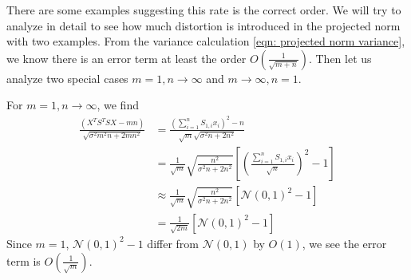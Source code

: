 \documentclass[12pt]{extarticle}
\newtheorem{lemma}[other]{Lemma}
\newcommand{\cN}{{\mathcal{N}}}
\newcommand{\field}[1]{\mathbb{#1}}
\newcommand{\R}{\field{R}}
\newcommand{\1}{\field{1}}
\newcommand{\p}{\field{P}}
\DeclareMathOperator{\E}{\mathbb{E}}
\newcommand{\mat}[2][rrrrrrrrrrrrrrrrrrrrrrrrrrrrrrrr]{\left[ \begin{array}{#1} #2 \\ \end{array}\right]}
\numberwithin{equation}{section}
\begin{document}


There are some examples suggesting this rate is the correct order. We will try to analyze in detail to see how much distortion is introduced in the projected norm with two examples. From the variance calculation \cref{eqn: projected norm variance}, we know there is an error term at least the order $O(\frac{1}{\sqrt{m+n}})$. Then let us analyze two special cases $m=1, n\to \infty$ and $m\to \infty, n=1$.

For $m=1, n\to \infty$, we find 
\begin{align*}
    \frac{\left(X^TS^TSX - mn\right)}{ \sqrt{ \sigma^2 m^2n+2mn^2}}   
    & = \frac{\left(\sum_{i=1}^n S_{1,i} x_i\right)^2 - n}{ \sqrt{m}\sqrt{ \sigma^2n +2n^2}}  \\
    & = \frac{1}{\sqrt{m}}\sqrt{\frac{n^2}{\sigma^2n +2n^2}}\left[ \left(\frac{\sum_{i=1}^n S_{1,i} x_i}{\sqrt{n}}\right)^2 -1 \right] \\
    & \approx \frac{1}{\sqrt{m}} \sqrt{\frac{n^2}{\sigma^2n +2n^2}}\left[ \cN(0,1)^2 -1 \right] \\
    & = \frac{1}{\sqrt{2m}}[\cN(0,1)^2 -1]
\end{align*}
Since $m=1$, $\cN(0,1)^2 -1$ differ from $\cN(0,1)$ by $O(1)$, we see the error term is $O(\frac{1}{\sqrt{m}})$. 
\end{document}
